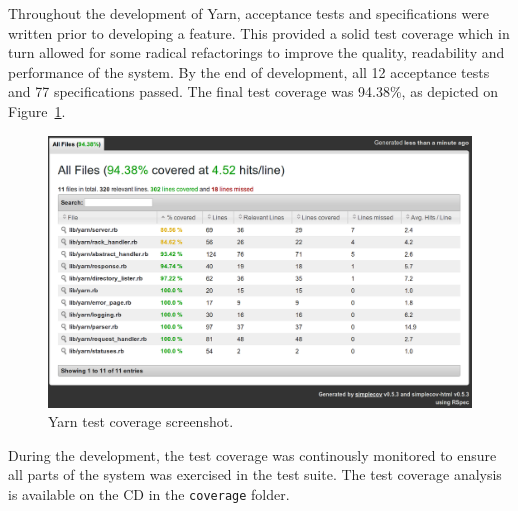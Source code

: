 Throughout the development of Yarn, acceptance tests and specifications were
written prior to developing a feature. This provided a solid test coverage
which in turn allowed for some radical refactorings to improve the quality,
readability and performance of the system. By the end of development, all
12 acceptance tests and 77 specifications passed. The final test coverage was
94.38\%, as depicted on Figure~\ref{coverage}. 

\begin{figure}[htb]
  \centering
  \includegraphics[width=1.0\textwidth]{img/coverage.png}
  \caption{Yarn test coverage screenshot.}
  \label{coverage}
\end{figure}

During the development, the test coverage was continously monitored to ensure
all parts of the system was exercised in the test suite. The test coverage
analysis is available on the CD in the \texttt{coverage} folder. 

